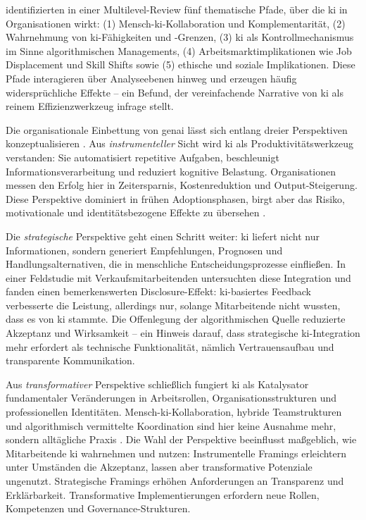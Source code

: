\textcite{bankinsMultilevelReviewArtificial2024} identifizierten in einer Multilevel-Review fünf thematische Pfade, über die \gls{ki} in Organisationen wirkt: (1) Mensch-\acrshort{ki}-Kollaboration und Komplementarität, (2) Wahrnehmung von \acrshort{ki}-Fähigkeiten und -Grenzen, (3) \gls{ki} als Kontrollmechanismus im Sinne algorithmischen Managements, (4) Arbeitsmarktimplikationen wie Job Displacement und Skill Shifts sowie (5) ethische und soziale Implikationen. Diese Pfade interagieren über Analyseebenen hinweg und erzeugen häufig widersprüchliche Effekte -- ein Befund, der vereinfachende Narrative von \gls{ki} als reinem Effizienzwerkzeug infrage stellt.

Die organisationale Einbettung von \gls{genai} lässt sich entlang dreier Perspektiven konzeptualisieren \parencite{bankinsMultilevelReviewArtificial2024}. Aus \textit{instrumenteller} Sicht wird \gls{ki} als Produktivitätswerkzeug verstanden: Sie automatisiert repetitive Aufgaben, beschleunigt Informationsverarbeitung und reduziert kognitive Belastung. Organisationen messen den Erfolg hier in Zeitersparnis, Kostenreduktion und Output-Steigerung. Diese Perspektive dominiert in frühen Adoptionsphasen, birgt aber das Risiko, motivationale und identitätsbezogene Effekte zu übersehen \parencite{edwardsManagerialControlFeedback2024}.

Die \textit{strategische} Perspektive geht einen Schritt weiter: \gls{ki} liefert nicht nur Informationen, sondern generiert Empfehlungen, Prognosen und Handlungsalternativen, die in menschliche Entscheidungsprozesse einfließen. In einer Feldstudie mit Verkaufsmitarbeitenden untersuchten \textcite{tongJanusFaceArtificial2021} diese Integration und fanden einen bemerkenswerten Disclosure-Effekt: \acrshort{ki}-basiertes Feedback verbesserte die Leistung, allerdings nur, solange Mitarbeitende nicht wussten, dass es von \gls{ki} stammte. Die Offenlegung der algorithmischen Quelle reduzierte Akzeptanz und Wirksamkeit -- ein Hinweis darauf, dass strategische \acrshort{ki}-Integration mehr erfordert als technische Funktionalität, nämlich Vertrauensaufbau und transparente Kommunikation.

Aus \textit{transformativer} Perspektive schließlich fungiert \gls{ki} als Katalysator fundamentaler Veränderungen in Arbeitsrollen, Organisationsstrukturen und professionellen Identitäten. Mensch-\acrshort{ki}-Kollaboration, hybride Teamstrukturen und algorithmisch vermittelte Koordination sind hier keine Ausnahme mehr, sondern alltägliche Praxis \parencite{bankinsMultilevelReviewArtificial2024}. Die Wahl der Perspektive beeinflusst maßgeblich, wie Mitarbeitende \gls{ki} wahrnehmen und nutzen: Instrumentelle Framings erleichtern unter Umständen die Akzeptanz, lassen aber transformative Potenziale ungenutzt. Strategische Framings erhöhen Anforderungen an Transparenz und Erklärbarkeit. Transformative Implementierungen erfordern neue Rollen, Kompetenzen und Governance-Strukturen.

